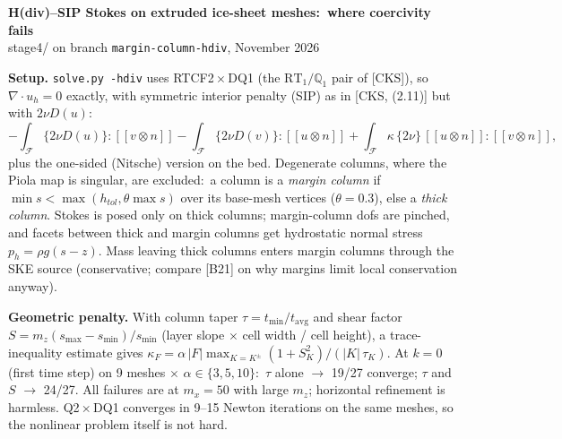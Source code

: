 \documentclass[10pt]{article}
\newcommand{\jump}[1]{[\![#1]\!]}
\newcommand{\avgb}[1]{\{#1\}}
\begin{document}
\begin{center}
{\large\bf H(div)--SIP Stokes on extruded ice-sheet meshes:\ where coercivity fails}\\[1pt]
{\small stage4/ on branch \texttt{margin-column-hdiv}, November 2026}
\end{center}

\textbf{Setup.} \texttt{solve.py -hdiv} uses RTCF2\,$\times$\,DQ1 (the $\mathrm{RT}_1/\mathbb{Q}_1$ pair of [CKS]), so $\nabla\cdot u_h=0$ exactly, with symmetric interior penalty (SIP) as in [CKS, (2.11)] but with $2\nu D(u)$:
\[
\textstyle -\int_{\mathcal{F}} \avgb{2\nu D(u)}:\jump{v\otimes n} - \int_{\mathcal{F}} \avgb{2\nu D(v)}:\jump{u\otimes n} + \int_{\mathcal{F}} \kappa\,\avgb{2\nu}\,\jump{u\otimes n}:\jump{v\otimes n},
\]
plus the one-sided (Nitsche) version on the bed. Degenerate columns, where the Piola map is singular, are excluded:\ a column is a \emph{margin column} if $\min s<\max(h_{tol},\theta\max s)$ over its base-mesh vertices ($\theta=0.3$), else a \emph{thick column}. Stokes is posed only on thick columns; margin-column dofs are pinched, and facets between thick and margin columns get hydrostatic normal stress $p_h=\rho g(s-z)$. Mass leaving thick columns enters margin columns through the SKE source (conservative; compare [B21] on why margins limit local conservation anyway).

\textbf{Geometric penalty.} With column taper $\tau=t_{\min}/t_{\text{avg}}$ and shear factor $S=m_z(s_{\max}-s_{\min})/s_{\min}$ (layer slope $\times$ cell width / cell height), a trace-inequality estimate gives
$\kappa_F=\alpha\,|F|\max_{K=K^\pm}(1+S_K^2)/(|K|\,\tau_K)$.
At $k=0$ (first time step) on 9 meshes $\times$ $\alpha\in\{3,5,10\}$:\ $\tau$ alone $\to$ 19/27 converge; $\tau$ and $S$ $\to$ 24/27. All failures are at $m_x=50$ with large $m_z$; horizontal refinement is harmless. Q2\,$\times$\,DQ1 converges in 9--15 Newton iterations on the same meshes, so the nonlinear problem itself is not hard.
\end{document}
